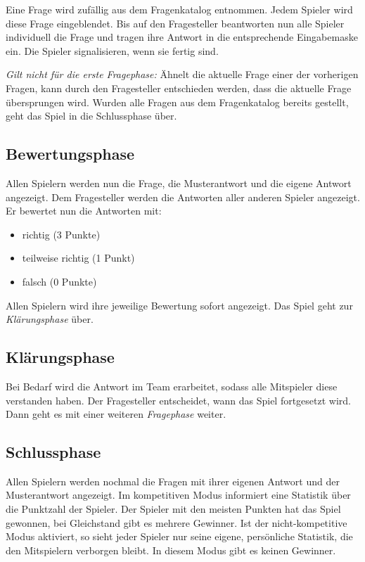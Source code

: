 \documentclass[a4paper,11pt,listof=numbered,glossary=totoc,parskip=half,toc=bib]{scrreprt}
\begin{document}
Eine Frage wird zufällig aus dem Fragenkatalog entnommen. Jedem Spieler wird diese Frage eingeblendet. Bis auf den Fragesteller beantworten nun alle Spieler individuell die Frage und tragen ihre Antwort in die entsprechende Eingabemaske ein. Die Spieler signalisieren, wenn sie fertig sind.

\textit{Gilt nicht für die erste Fragephase:}
Ähnelt die aktuelle Frage einer der vorherigen Fragen, kann durch den Fragesteller entschieden werden, dass die aktuelle Frage übersprungen wird.
Wurden alle Fragen aus dem Fragenkatalog bereits gestellt, geht das Spiel in die Schlussphase über.

\subsection{Bewertungsphase}

Allen Spielern werden nun die Frage, die Musterantwort und die eigene Antwort angezeigt. Dem Fragesteller werden die Antworten aller anderen Spieler angezeigt. Er bewertet nun die Antworten mit:

\begin{itemize}
	\item richtig (3 Punkte)
	\item teilweise richtig (1 Punkt)
	\item falsch (0 Punkte)
\end{itemize}

Allen Spielern wird ihre jeweilige Bewertung sofort angezeigt. Das Spiel geht zur \textit{Klärungsphase} über.

\subsection{Klärungsphase}

Bei Bedarf wird die Antwort im Team erarbeitet, sodass alle Mitspieler diese verstanden haben. Der Fragesteller entscheidet, wann das Spiel fortgesetzt wird. Dann geht es mit einer weiteren \textit{Fragephase} weiter.

\subsection{Schlussphase}

Allen Spielern werden nochmal die Fragen mit ihrer eigenen Antwort und der Musterantwort angezeigt.
Im kompetitiven Modus informiert eine Statistik über die Punktzahl der Spieler. Der Spieler mit den meisten Punkten hat das Spiel gewonnen, bei Gleichstand gibt es mehrere Gewinner.
Ist der nicht-kompetitive Modus aktiviert, so sieht jeder Spieler nur seine eigene, persönliche Statistik, die den Mitspielern verborgen bleibt. In diesem Modus gibt es keinen Gewinner.
\end{document}
